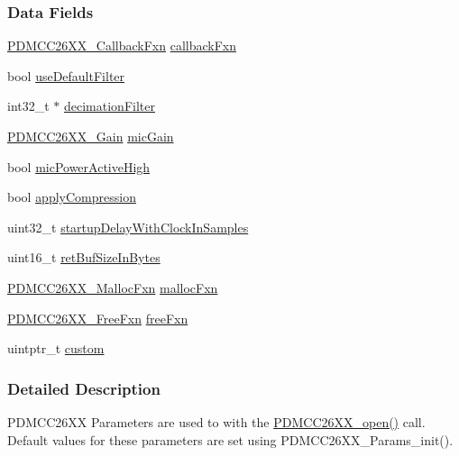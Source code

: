 \subsubsection*{Data Fields}
\begin{DoxyCompactItemize}
\item 
\hyperlink{_p_d_m_c_c26_x_x_8h_ab6fdee59a79029e938e3fbf0e446fa91}{P\+D\+M\+C\+C26\+X\+X\+\_\+\+Callback\+Fxn} \hyperlink{struct_p_d_m_c_c26_x_x___params_ada480cae6ca7398efef4293350f92090}{callback\+Fxn}
\item 
bool \hyperlink{struct_p_d_m_c_c26_x_x___params_a44e4ebc3f9b009925348a8dca9948721}{use\+Default\+Filter}
\item 
int32\+\_\+t $\ast$ \hyperlink{struct_p_d_m_c_c26_x_x___params_a5b6560c1288d7f2cf106725784939ec1}{decimation\+Filter}
\item 
\hyperlink{_p_d_m_c_c26_x_x_8h_a8c2d67aee547a2c8228465034ae0267f}{P\+D\+M\+C\+C26\+X\+X\+\_\+\+Gain} \hyperlink{struct_p_d_m_c_c26_x_x___params_abe0c91431756697a699f389f7bfaf680}{mic\+Gain}
\item 
bool \hyperlink{struct_p_d_m_c_c26_x_x___params_ab0b5ba7b77e820496242b568e9722197}{mic\+Power\+Active\+High}
\item 
bool \hyperlink{struct_p_d_m_c_c26_x_x___params_a8f7df45298c5e74e04e18050fc36adf9}{apply\+Compression}
\item 
uint32\+\_\+t \hyperlink{struct_p_d_m_c_c26_x_x___params_a1ffbb2852a48ff157c0f58df4dce4a3b}{startup\+Delay\+With\+Clock\+In\+Samples}
\item 
uint16\+\_\+t \hyperlink{struct_p_d_m_c_c26_x_x___params_a05bff0a3c2ddbb3a49c2bc7a47a7fe24}{ret\+Buf\+Size\+In\+Bytes}
\item 
\hyperlink{_p_d_m_c_c26_x_x_8h_acce02978ce536ea3b98a673587a6e75c}{P\+D\+M\+C\+C26\+X\+X\+\_\+\+Malloc\+Fxn} \hyperlink{struct_p_d_m_c_c26_x_x___params_aea959cfd6c30b0af7f4c9547c5186d0a}{malloc\+Fxn}
\item 
\hyperlink{_p_d_m_c_c26_x_x_8h_af95e29fbea1fadfb011e4ceaa36f1ab0}{P\+D\+M\+C\+C26\+X\+X\+\_\+\+Free\+Fxn} \hyperlink{struct_p_d_m_c_c26_x_x___params_ae0149ca1615d25422c7e0d9c473ccd2e}{free\+Fxn}
\item 
uintptr\+\_\+t \hyperlink{struct_p_d_m_c_c26_x_x___params_ad41793869ce12a57f513749b244aa1a3}{custom}
\end{DoxyCompactItemize}


\subsubsection{Detailed Description}
P\+D\+M\+C\+C26\+X\+X Parameters are used to with the \hyperlink{_p_d_m_c_c26_x_x_8h_a431d9b71e0d0eebd5ab85960f1c82ee0}{P\+D\+M\+C\+C26\+X\+X\+\_\+open()} call. Default values for these parameters are set using P\+D\+M\+C\+C26\+X\+X\+\_\+\+Params\+\_\+init(). 

